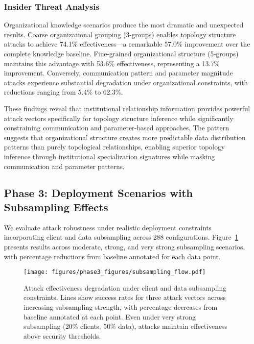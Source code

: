 \subsubsection{Insider Threat Analysis}

Organizational knowledge scenarios produce the most dramatic and unexpected results. Coarse organizational grouping (3-groups) enables topology structure attacks to achieve 74.1\% effectiveness—a remarkable 57.0\% improvement over the complete knowledge baseline. Fine-grained organizational structure (5-groups) maintains this advantage with 53.6\% effectiveness, representing a 13.7\% improvement. Conversely, communication pattern and parameter magnitude attacks experience substantial degradation under organizational constraints, with reductions ranging from 5.4\% to 62.3\%.

These findings reveal that institutional relationship information provides powerful attack vectors specifically for topology structure inference while significantly constraining communication and parameter-based approaches. The pattern suggests that organizational structure creates more predictable data distribution patterns than purely topological relationships, enabling superior topology inference through institutional specialization signatures while masking communication and parameter patterns.

\subsection{Phase 3: Deployment Scenarios with Subsampling Effects}

We evaluate attack robustness under realistic deployment constraints incorporating client and data subsampling across 288 configurations. Figure~\ref{fig:subsampling_flow} presents results across moderate, strong, and very strong subsampling scenarios, with percentage reductions from baseline annotated for each data point.

\begin{figure}[!t]
\centering
\texttt{[image: figures/phase3\_figures/subsampling\_flow.pdf]}
\caption{Attack effectiveness degradation under client and data subsampling constraints. Lines show success rates for three attack vectors across increasing subsampling strength, with percentage decreases from baseline annotated at each point. Even under very strong subsampling (20\% clients, 50\% data), attacks maintain effectiveness above security thresholds.}
\label{fig:subsampling_flow}
\end{figure}

